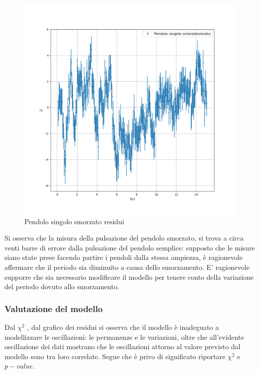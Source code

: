 \documentclass{article}
\begin{document}
            \begin{figure}[h! ]
                \centering
                \includegraphics[width=1\linewidth]{Pendolo singolo smorzato_residuals.png}
                \caption{Pendolo singolo smorzato residui}
                \label{fig:pmres}
            \end{figure}


            Si osserva che la misura della pulsazione del pendolo smorzato, si trova a circa venti barre di errore dalla pulsazione del pendolo semplice: supposto che le misure siano state prese facendo partire i pendoli dalla stessa ampiezza, è ragionevole affermare che il periodo sia diminuito a causa dello smorzamento.
            E' ragionevole supporre che sia necessario modificare il modello per tenere conto della variazione del periodo dovuto allo smorzamento.
        



            \subsubsection{Valutazione del modello}
            \label{sez:modello}
            Dal $\chi^2$ , dal grafico dei residui si osserva che il modello è inadeguato a modellizzare le oscillazioni: le permanenze e le variazioni, oltre che all'evidente oscillazione dei dati mostrano che le oscillazioni attorno al valore previsto dal modello sono tra loro correlate.
             Segue che è privo di significato riportare $\chi^2$ e $p-value$.
             
\end{document}
